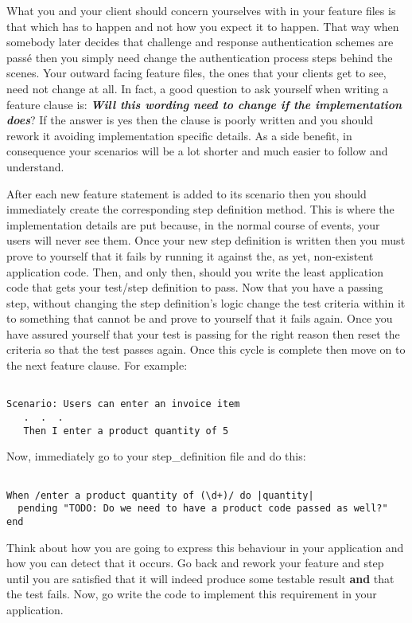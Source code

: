 What you and your client should concern yourselves with in your feature files is that which has to happen and not how you expect it to happen.  That way when somebody later decides that challenge and response authentication schemes are passé then you simply need change the authentication process steps behind the scenes.  Your outward facing feature files, the ones that your clients get to see, need not change at all.  In fact, a good question to ask yourself when writing a feature clause is: \textbf{\emph{Will this wording need to change if the implementation does}}?  If the answer is yes then the clause is poorly written and you should rework it avoiding implementation specific details.  As a side benefit, in consequence your scenarios will be a lot shorter and much easier to follow and understand.

After each new feature statement is added to its scenario then you should immediately create the corresponding step definition method.  This is where the implementation details are put because, in the normal course of events, your users will never see them.  Once your new step definition is written then you must prove to yourself that it fails by running it against the, as yet, non-existent application code.  Then, and only then, should you write the least application code that gets your test/step definition to pass.  Now that you have a passing step, without changing the step definition's logic change the test criteria within it to something that cannot be and prove to yourself that it fails again. Once you have assured yourself that your test is passing for the right reason then reset the criteria so that the test passes again.  Once this cycle is complete then move on to the next feature clause.  For example:
\begin{verbatim}

Scenario: Users can enter an invoice item
   .  .  .
   Then I enter a product quantity of 5

\end{verbatim}

Now, immediately go to your step\_definition file and do this:
\begin{verbatim}

When /enter a product quantity of (\d+)/ do |quantity|
  pending "TODO: Do we need to have a product code passed as well?"
end

\end{verbatim}

Think about how you are going to express this behaviour in your application and how you can detect that it occurs.  Go back and rework your feature and step until you are satisfied that it will indeed produce some testable result \textbf{and} that the test fails.  Now, go write the code to implement this requirement in your application.

